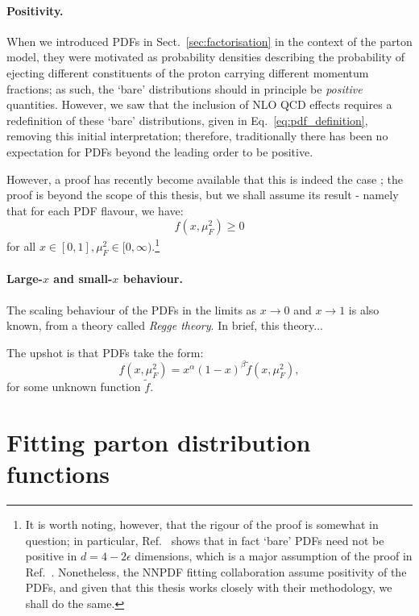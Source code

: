 \documentclass[withindex,glossary]{cam-thesis}
\begin{document}
\paragraph{Positivity.} When we introduced PDFs in Sect.~\ref{sec:factorisation} in the context of the parton model, they were motivated as probability densities describing the probability of ejecting different constituents of the proton carrying different momentum fractions; as such, the `bare' distributions should in principle be \textit{positive} quantities. However, we saw that the inclusion of NLO QCD effects requires a redefinition of these `bare' distributions, given in Eq.~\eqref{eq:pdf_definition}, removing this initial interpretation; therefore, traditionally there has been no expectation for PDFs beyond the leading order to be positive.

However, a proof has recently become available that this is indeed the case \cite{Candido:2020yat}; the proof is beyond the scope of this thesis, but we shall assume its result - namely that for each PDF flavour, we have:
\begin{equation}
f(x,\mu_F^2) \geq 0
\end{equation}
for all $x \in [0,1], \mu_F^2 \in [0,\infty)$.\footnote{It is worth noting, however, that the rigour of the proof is somewhat in question; in particular, Ref.~\cite{Collins:2021vke} shows that in fact `bare' PDFs need not be positive in $d = 4 - 2\epsilon$ dimensions, which is a major assumption of the proof in Ref.~\cite{Candido:2020yat}. Nonetheless, the NNPDF fitting collaboration assume positivity of the PDFs, and given that this thesis works closely with their methodology, we shall do the same.}

\paragraph{Large-$x$ and small-$x$ behaviour.} The scaling behaviour of the PDFs in the limits as $x \rightarrow 0$ and $x \rightarrow 1$ is also known, from a theory called \textit{Regge theory}. In brief, this theory...

The upshot is that PDFs take the form:
\begin{equation}
f(x,\mu_F^2) = x^{\alpha} (1-x)^{\beta} \tilde{f}(x,\mu_F^2),
\end{equation}
for some unknown function $\tilde{f}$. 


\section{Fitting parton distribution functions}
\label{sec:pdffitting}
\end{document}
